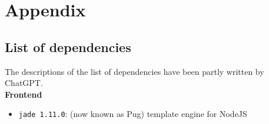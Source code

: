 \section{Appendix}


\subsection{List of dependencies}
\label{app:dependencies}

\noindent The descriptions of the list of dependencies have been partly written by ChatGPT.\\ 

\textbf{Frontend}
\begin{itemize}
    \item \texttt{jade 1.11.0}: (now known as Pug) template engine for NodeJS\\
\end{itemize}

